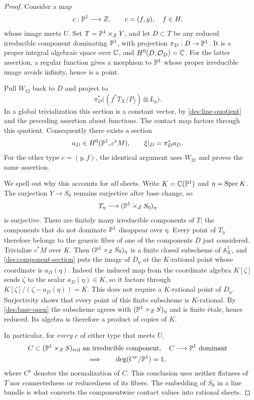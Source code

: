 \begin{proof}
Consider a map
\[
c:\mathbb P^1\longrightarrow Z,\qquad c=(f,y),\quad f\in H,
\]
whose image meets $U$. Set $T=\mathbb P^1\times_ZY$, and let
$D\subset T$ be any reduced irreducible component dominating
$\mathbb P^1$, with projection $\pi_D:D\to\mathbb P^1$. It is a proper
integral algebraic space over $\mathbb C$, and
$H^0(D,\mathcal O_D)=\mathbb C$. For the latter assertion, a regular function
gives a morphism to $\mathbb P^1$ whose proper irreducible image avoids
infinity, hence is a point.

Pull $W_{12}$ back to $D$ and project to
\[
\pi_D^*\bigl((f^*T_X/P_f)\otimes L_y\bigr).
\]
In a global trivialization this section is a constant vector, by
\eqref{des:line-quotient} and the preceding assertion about functions.
The contact map factors through this quotient. Consequently there
exists a section
\begin{equation}\label{des:component-section}
a_D\in H^0(\mathbb P^1,c^*M),\qquad
\xi|_D=\pi_D^*a_D.
\end{equation}
For the other type $c=(y,f)$, the identical argument uses $W_{21}$
and proves the same assertion.

We spell out why this accounts for \emph{all} sheets. Write
$K=\mathbb C(\mathbb P^1)$ and $\eta=\operatorname{Spec} K$. The surjection $Y\to S_0$
remains surjective after base change, so
\[
T_\eta\longrightarrow (\mathbb P^1\times_ZS_0)_\eta
\]
is surjective. There are finitely many irreducible components of $T$;
the components that do not dominate $\mathbb P^1$ disappear over $\eta$.
Every point of $T_\eta$ therefore belongs to the generic fiber of one
of the components $D$ just considered. Trivialize $c^*M$ over $K$.
Then $(\mathbb P^1\times_ZS_0)_\eta$ is a finite closed subscheme of
$\mathbb A^1_K$, and \eqref{des:component-section} puts the image of
$D_\eta$ at the $K$-rational point whose coordinate is $a_D(\eta)$.
Indeed the induced map from the coordinate algebra $K[\zeta]$ sends
$\zeta$ to the scalar $a_D(\eta)\in K$, so it factors through
$K[\zeta]/(\zeta-a_D(\eta))=K$. This does not require a
$K$-rational point of $D_\eta$.
Surjectivity shows that every point of this finite subscheme is
$K$-rational. By \eqref{des:base-open} the subscheme agrees with
$(\mathbb P^1\times_ZS)_\eta$ and is finite \'etale, hence reduced.
Its algebra is therefore a product of copies of $K$.

In particular, for \emph{every} $c$ of either type that meets $U$,
\begin{equation}\label{des:all-sheets}
\begin{gathered}
C\subset(\mathbb P^1\times_ZS)_{\mathrm{red}}\text{ an irreducible component},
\quad C\longrightarrow\mathbb P^1\text{ dominant}\\
\Longrightarrow\qquad \deg(C^\nu/\mathbb P^1)=1,
\end{gathered}
\end{equation}
where $C^\nu$ denotes the normalization of $C$.
This conclusion uses neither flatness of $T$ nor connectedness or
reducedness of its fibers. The embedding of $S_0$ in a line bundle is
what converts the componentwise contact values into rational sheets.


\end{proof}
